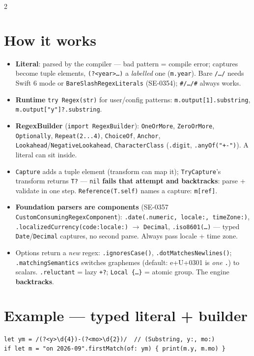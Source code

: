 \documentclass[8pt]{extarticle}
\begin{document}
\begin{multicols}{2}
\raggedright

\section{How it works}
\begin{itemize}
  \item \textbf{Literal}: parsed by the compiler — bad pattern = compile
        error; captures become tuple elements, \texttt{(?<year>…)} a
        \emph{labelled} one (\texttt{m.year}). Bare \texttt{/…/} needs Swift 6
        mode or \texttt{BareSlashRegexLiterals} (SE-0354); \texttt{\#/…/\#}
        always works.
  \item \textbf{Runtime} \texttt{try Regex(str)} for user/config patterns:
        \texttt{m.output[1].substring}, \texttt{m.output["y"]?.substring}.
  \item \textbf{RegexBuilder} (\texttt{import RegexBuilder}):
        \texttt{OneOrMore}, \texttt{ZeroOrMore}, \texttt{Optionally},
        \texttt{Repeat(2...4)}, \texttt{ChoiceOf}, \texttt{Anchor},
        \texttt{Lookahead}/\texttt{NegativeLookahead}, \texttt{CharacterClass}
        (\texttt{.digit}, \texttt{.anyOf("+-")}). A literal can sit inside.
  \item \texttt{Capture} adds a tuple element (transform can map it);
        \texttt{TryCapture}'s transform returns \texttt{T?} — \texttt{nil}
        \textbf{fails that attempt and backtracks}: parse + validate in one
        step. \texttt{Reference(T.self)} names a capture: \texttt{m[ref]}.
  \item \textbf{Foundation parsers are components} (SE-0357
        \texttt{CustomConsumingRegexComponent}):
        \texttt{.date(.numeric, locale:, timeZone:)},
        \texttt{.localizedCurrency(code:locale:)} $\to$ \texttt{Decimal},
        \texttt{.iso8601(…)} — typed \texttt{Date}/\texttt{Decimal} captures,
        no second parse. Always pass locale + time zone.
  \item Options return a \emph{new} regex: \texttt{.ignoresCase()},
        \texttt{.dotMatchesNewlines()}; \texttt{.matchingSemantics} switches
        graphemes (default: e+U+0301 is \emph{one} \texttt{.}) to scalars. \texttt{.reluctant} = lazy \texttt{+?};
        \texttt{Local \{…\}} = atomic group. The engine \textbf{backtracks}.
\end{itemize}

\section{Example — typed literal + builder}
\begin{lstlisting}[language=SwiftSheet]
let ym = /(?<y>\d{4})-(?<mo>\d{2})/  // (Substring, y:, mo:)
if let m = "on 2026-09".firstMatch(of: ym) { print(m.y, m.mo) }


\end{lstlisting}
\end{multicols}
\end{document}
